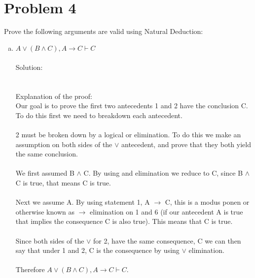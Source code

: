 \documentclass{article}
\newcommand*\moveToRight[1]{\hspace*{0em plus 1fill}\makebox{(#1)}}
\begin{document}
\section{Problem 4}
Prove the following arguments are valid using Natural Deduction: \moveToRight{20 marks}
    \begin{enumerate}[(a)]
        \item $A \vee (B \wedge C), A \to C \vdash C$\moveToRight{10 marks}\\\\
        Solution:\\
        \\\\
        Explanation of the proof:\\
        Our goal is to prove the first two antecedents 1 and 2 have the conclusion C. To do this first we need to breakdown each antecedent. 
        \\\\2 must be broken down by a logical or elimination. To do this we make an assumption on both sides of the $\vee$ antecedent, and prove that they both yield the same conclusion. 
        \\\\We first assumed B $\wedge$ C. By using and elimination we reduce to C, since B $\wedge$ C is true, that means C is true.
        \\\\Next we assume A. By using statement 1, A $\to$ C, this is a modus ponen or otherwise known as $\to$ elimination on 1 and 6 (if our antecedent A is true that implies the consequence C is also true). This means that C is true.
        \\\\Since both sides of the $\vee$ for 2, have the same consequence, C we can then say that under 1 and 2, C is the consequence by using $\vee$ elimination.
        \\\\Therefore $A \vee (B \wedge C), A \to C \vdash C$.        
        \newpage
        

\end{enumerate}
\end{document}
